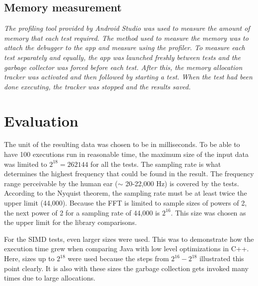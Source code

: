 
\subsection{Memory measurement}
\emph{The profiling tool provided by Android Studio was used to measure the amount of memory that each test required. The method used to measure the memory was to attach the debugger to the app and measure using the profiler. To measure each test separately and equally, the app was launched freshly between tests and the garbage collector was forced before each test. After this, the memory allocation tracker was activated and then followed by starting a test. When the test had been done executing, the tracker was stopped and the results saved.}

\section{Evaluation}
The unit of the resulting data was chosen to be in milliseconds. To be able to have 100 executions run in reasonable time, the maximum size of the input data was limited to $2^{18} = 262144$ for all the tests. The sampling rate is what determines the highest frequency that could be found in the result. The frequency range perceivable by the human ear ($\sim$ 20-22,000 Hz) is covered by the tests. According to the Nyquist theorem, the sampling rate must be at least twice the upper limit (44,000). Because the FFT is limited to sample sizes of powers of 2, the next power of 2 for a sampling rate of 44,000 is $2^{16}$. This size was chosen as the upper limit for the library comparisons.

For the SIMD tests, even larger sizes were used. This was to demonstrate how the execution time grew when comparing Java with low level optimizations in C++. Here, sizes up to $2^{18}$ were used because the steps from $2^{16} - 2^{18}$ illustrated this point clearly. It is also with these sizes the garbage collection gets invoked many times due to large allocations.

